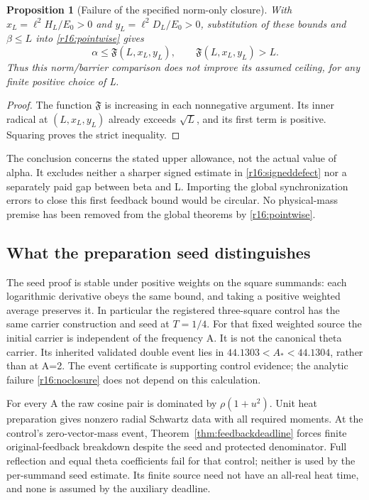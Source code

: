 \documentclass[11pt]{article}
\numberwithin{equation}{section}
\newtheorem{proposition}[theorem]{Proposition}
\begin{document}
\begin{proposition}[Failure of the specified norm-only closure]
\label{r16:failedbootstrap}
With $x_L=\ell^2H_L/E_0>0$ and $y_L=\ell^2D_L/E_0>0$, substitution of
these bounds and $\beta\le L$ into \eqref{r16:pointwise} gives
\begin{equation}\label{r16:noclosure}
 \alpha\le\mathfrak F(L,x_L,y_L),\qquad
             \mathfrak F(L,x_L,y_L)>L.
\end{equation}
Thus this norm/barrier comparison does not improve its assumed ceiling,
for any finite positive choice of L.
\end{proposition}
\begin{proof}
The function $\mathfrak F$ is increasing in each nonnegative argument.
Its inner radical at $(L,x_L,y_L)$ already exceeds $\sqrt L$, and its
first term is positive. Squaring proves the strict inequality.
\end{proof}

The conclusion concerns the stated upper allowance, not the actual
value of alpha. It excludes neither a sharper signed estimate in
\eqref{r16:signeddefect} nor a separately paid gap between beta and L.
Importing the global synchronization errors to close this first
feedback bound would be circular. No physical-mass premise has been
removed from the global theorems by \eqref{r16:pointwise}.

\subsection{What the preparation seed distinguishes}

The seed proof is stable under positive weights on the square summands:
each logarithmic derivative obeys the same bound, and taking a positive
weighted average preserves it. In particular the registered
three-square control \cite{WeightedSquareControl} has the same carrier
construction and seed at $T=1/4$. For that fixed weighted source the
initial carrier is independent of the frequency A. It is not the
canonical theta carrier. Its inherited validated double event lies in
$44.1303<A_*<44.1304$, rather than at A=2. The event certificate is
supporting control evidence; the analytic failure
\eqref{r16:noclosure} does not depend on this calculation.

For every A the raw cosine pair is dominated by
$\rho(1+u^2)$. Unit heat preparation gives nonzero radial Schwartz data
with all required moments. At the control's zero-vector-mass event,
Theorem~\ref{thm:feedbackdeadline} forces finite original-feedback
breakdown despite the seed and protected denominator. Full reflection
and equal theta coefficients fail for that control; neither is used
by the per-summand seed estimate. Its finite source need not have an
all-real heat time, and none is assumed by the auxiliary deadline.
\end{document}
